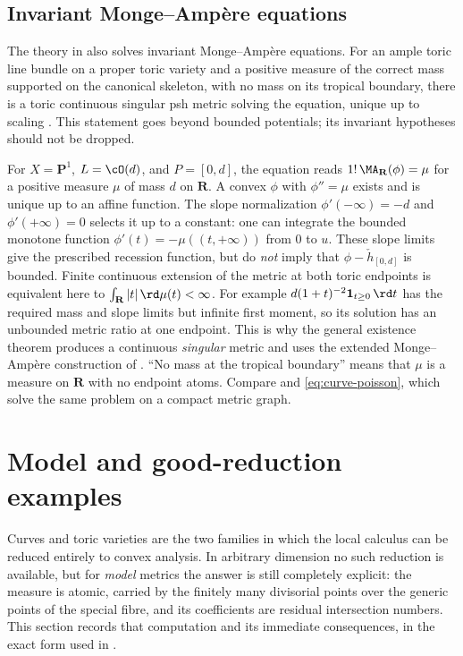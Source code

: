 \subsection{Invariant Monge--Amp\`ere equations}
\label{sec:ch19-toric-equation}

The theory in \cite{BGJKK25} also solves invariant Monge--Amp\`ere equations.
For an ample toric line bundle on a proper toric variety and a positive
measure of the correct mass supported on the canonical skeleton, with no
mass on its tropical boundary, there is a toric continuous singular psh
metric solving the equation, unique up to scaling
\cite[Theorem~6.3.13]{BGJKK25}.  This statement goes beyond bounded
potentials; its invariant hypotheses should not be dropped.

\begin{example}
\label{ex:ch19-toric-solve-p1}
For $X=\mathbf P^1$, $L=\cO(d)$, and $P=[0,d]$, the equation reads
$1!\,\MA_{\mathbf R}(\phi)=\mu$ for a positive measure $\mu$ of mass
$d$ on $\mathbf R$.  A convex $\phi$ with $\phi''=\mu$ exists and is
unique up to an affine function.  The slope normalization
$\phi'(-\infty)=-d$ and $\phi'(+\infty)=0$ selects it up to a constant:
one can integrate the bounded monotone function
$\phi'(t)=-\mu((t,+\infty))$ from $0$ to $u$.
These slope limits give the prescribed recession function, but do
\emph{not} imply that $\phi-\check h_{[0,d]}$ is bounded.
Finite continuous extension of the metric at both toric endpoints is
equivalent here to $\int_{\mathbf R}|t|\,\rd\mu(t)<\infty$.
For example $d(1+t)^{-2}\mathbf1_{t\geq0}\,\rd t$ has the required mass
and slope limits but infinite first moment, so its solution has an unbounded
metric ratio at one endpoint.  This is why the general existence theorem
produces a continuous \emph{singular} metric and uses the extended
Monge--Amp\`ere construction of \cite[\S6.3]{BGJKK25}.
``No mass at the tropical boundary'' means that $\mu$ is a measure on
$\mathbf R$ with no endpoint atoms.  Compare  and
\eqref{eq:curve-poisson}, which solve the same problem on a compact metric
graph.
\end{example}

\section{Model and good-reduction examples}
\label{sec:ch19-models}

Curves and toric varieties are the two families in which the local calculus
can be reduced entirely to convex analysis.  In arbitrary dimension no such
reduction is available, but for \emph{model} metrics the answer is still
completely explicit: the measure is atomic, carried by the finitely many
divisorial points over the generic points of the special fibre, and its
coefficients are residual intersection numbers.  This section records that
computation and its immediate consequences, in the exact form used in
.

